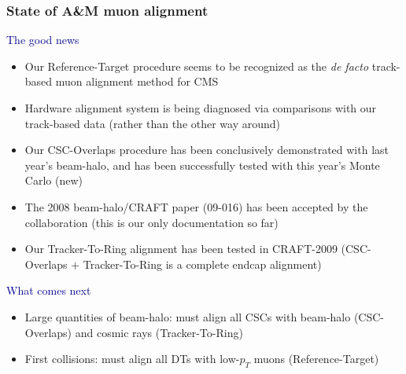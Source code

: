 \documentclass[compress]{beamer}
\begin{document}
\begin{frame}
\frametitle{State of A\&M muon alignment}
\textcolor{darkblue}{\large The good news}

\begin{itemize}
\item Our Reference-Target procedure seems to be recognized as the {\it de facto} track-based muon alignment method for CMS
\item Hardware alignment system is being diagnosed via comparisons with our track-based data (rather than the other way around)
\item Our CSC-Overlaps procedure has been conclusively demonstrated with last year's beam-halo, and has been successfully tested with this year's Monte Carlo (new)
\item The 2008 beam-halo/CRAFT paper (09-016) has been accepted by the collaboration (this is our only documentation so far)
\item Our Tracker-To-Ring alignment has been tested in CRAFT-2009 (CSC-Overlaps $+$ Tracker-To-Ring is a complete endcap alignment)
\end{itemize}

\textcolor{darkblue}{\large What comes next}
\begin{itemize}
\item Large quantities of beam-halo: must align all CSCs with beam-halo (CSC-Overlaps) and cosmic rays (Tracker-To-Ring)
\item First collisions: must align all DTs with low-$p_T$ muons \mbox{(Reference-Target)\hspace{-1 cm}}
\end{itemize}
\end{frame}
\end{document}
